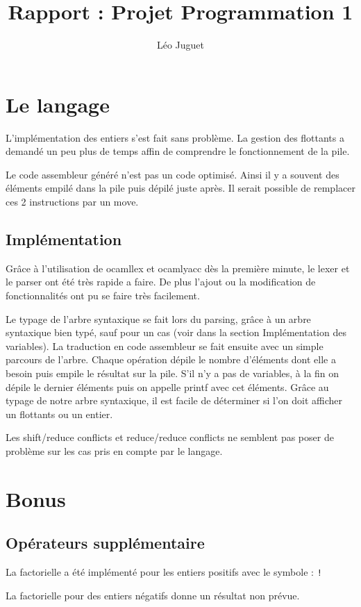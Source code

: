 \documentclass[12pt]{article}
\title{Rapport : Projet Programmation 1}
\author{Léo Juguet}
\date{}
\begin{document}
\maketitle
\newpage

\section{Le langage}
L'implémentation des entiers s'est fait sans problème.
La gestion des flottants a demandé un peu plus de temps
affin de comprendre le fonctionnement de la pile.

Le code assembleur généré n'est pas un code optimisé. Ainsi il 
y a souvent des éléments empilé dans la pile puis dépilé juste après.
Il serait possible de remplacer ces 2 instructions par un move.
\subsection{Implémentation}
Grâce à l'utilisation de ocamllex et ocamlyacc dès la première minute,
le lexer et le parser ont été très rapide a faire. De plus l'ajout
ou la modification de fonctionnalités ont pu se faire très facilement.

Le typage de l'arbre syntaxique se fait lors du parsing, grâce à un 
arbre syntaxique bien typé, sauf pour un cas (voir dans la section Implémentation des variables).
La traduction en code assembleur se fait ensuite avec un simple parcours de l'arbre. Chaque opération
dépile le nombre d'éléments dont elle a besoin puis empile le résultat sur la pile. S'il n'y a pas de variables,
à la fin on dépile le dernier éléments puis on appelle printf avec cet éléments. Grâce au typage de notre arbre syntaxique,
il est facile de déterminer si l'on doit afficher un flottants ou un entier.

Les shift/reduce conflicts et reduce/reduce conflicts ne semblent pas poser de problème sur les cas pris en compte par le langage.
\section{Bonus}
\subsection{Opérateurs supplémentaire}

La factorielle a été implémenté pour les entiers positifs avec le symbole : \verb|!| 

La factorielle pour des entiers négatifs donne un résultat non prévue.
\end{document}
